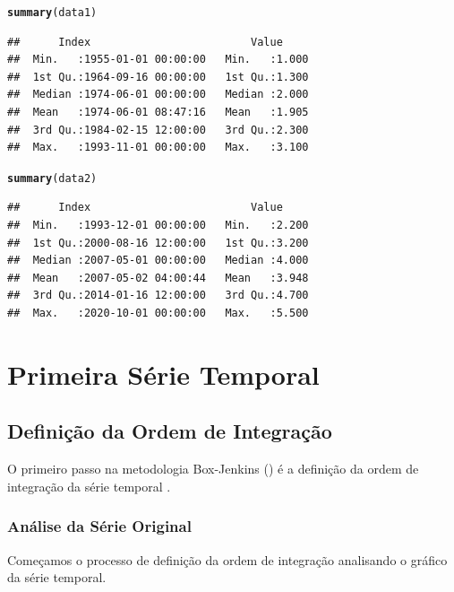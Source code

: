 \documentclass{article}\usepackage[]{graphicx}\usepackage[]{color}
\makeatletter
\newcommand{\hlstd}[1]{\textcolor[rgb]{0.345,0.345,0.345}{#1}}%
\newcommand{\hlkwd}[1]{\textcolor[rgb]{0.737,0.353,0.396}{\textbf{#1}}}%
\newenvironment{kframe}{%
 \def\at@end@of@kframe{}%
 \ifinner\ifhmode%
  \def\at@end@of@kframe{\end{minipage}}%
  \begin{minipage}{\columnwidth}%
 \fi\fi%
 \def\FrameCommand##1{\hskip\@totalleftmargin \hskip-\fboxsep
 \colorbox{shadecolor}{##1}\hskip-\fboxsep
     \hskip-\linewidth \hskip-\@totalleftmargin \hskip\columnwidth}%
 \MakeFramed {\advance\hsize-\width
   \@totalleftmargin\z@ \linewidth\hsize
   \@setminipage}}%
 {\par\unskip\endMakeFramed%
 \at@end@of@kframe}
\newenvironment{knitrout}{}{} %
\makeatother
\begin{document}
\begin{knitrout}
\color{fgcolor}\begin{kframe}
\begin{alltt}
\hlkwd{summary}\hlstd{(data1)}
\end{alltt}
\begin{verbatim}
##      Index                         Value      
##  Min.   :1955-01-01 00:00:00   Min.   :1.000  
##  1st Qu.:1964-09-16 00:00:00   1st Qu.:1.300  
##  Median :1974-06-01 00:00:00   Median :2.000  
##  Mean   :1974-06-01 08:47:16   Mean   :1.905  
##  3rd Qu.:1984-02-15 12:00:00   3rd Qu.:2.300  
##  Max.   :1993-11-01 00:00:00   Max.   :3.100
\end{verbatim}
\begin{alltt}
\hlkwd{summary}\hlstd{(data2)}
\end{alltt}
\begin{verbatim}
##      Index                         Value      
##  Min.   :1993-12-01 00:00:00   Min.   :2.200  
##  1st Qu.:2000-08-16 12:00:00   1st Qu.:3.200  
##  Median :2007-05-01 00:00:00   Median :4.000  
##  Mean   :2007-05-02 04:00:44   Mean   :3.948  
##  3rd Qu.:2014-01-16 12:00:00   3rd Qu.:4.700  
##  Max.   :2020-10-01 00:00:00   Max.   :5.500
\end{verbatim}
\end{kframe}
\end{knitrout}



\section{Primeira Série Temporal}

    \subsection{Definição da Ordem de Integração}
    
        O primeiro passo na metodologia Box-Jenkins (\cite{boxjenkins}) é a definição da ordem de integração da série temporal .
    
        \subsubsection{Análise da Série Original}
        
            Começamos o processo de definição da ordem de integração analisando o gráfico da série temporal.
        
\end{document}
